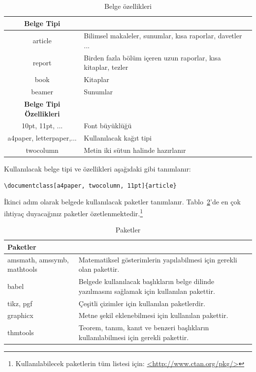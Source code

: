 \documentclass{article}
\begin{document}
\begin{table}[h]
\begin{center}
\caption{Belge özellikleri\label{tab: preamble}}
\begin{tabular}{| c | p{7cm} |}
\hline
\textbf{Belge Tipi} & \\ \hline
article & Bilimsel makaleler, sunumlar, kısa raporlar, davetler ... \\ \hline
report & Birden fazla bölüm içeren uzun raporlar, kısa kitaplar, tezler \\ \hline
book & Kitaplar \\ \hline
beamer & Sunumlar \\ \hline \hline
\textbf{Belge Tipi Özellikleri} & \\
\hline
10pt, 11pt, ... & Font büyüklüğü \\ \hline
a4paper, letterpaper,... & Kullanılacak kağıt tipi \\ \hline
twocolumn & Metin iki sütun halinde hazırlanır \\ \hline
\end{tabular}
\end{center}
\end{table}

Kullanılacak belge tipi ve özellikleri aşağıdaki gibi tanımlanır:

\begin{verbatim}
\documentclass[a4paper, twocolumn, 11pt]{article}
\end{verbatim}

İkinci adım olarak belgede kullanılacak paketler tanımlanır. Tablo~\ref{tab: packages}'de en çok ihtiyaç duyacağınız paketler özetlenmektedir.\footnote{Kullanılabilecek paketlerin tüm listesi için: \url{<http://www.ctan.org/pkg/>}}

\begin{table}[h]
\begin{center}
\caption{Paketler\label{tab: packages}}
\begin{tabular}{| p{4cm} | p{7cm} |}
\hline
\textbf{Paketler} & \\ \hline
amsmath, amssymb, mathtools & Matematiksel gösterimlerin yapılabilmesi için gerekli olan pakettir. \\ \hline
babel & Belgede kullanılacak başlıkların belge dilinde yazılmasını sağlamak için kullanılan pakettir. \\ \hline
tikz, pgf & Çeşitli çizimler için kullanılan paketlerdir. \\ \hline
graphicx & Metne şekil eklenebilmesi için kullanılan pakettir. \\ \hline
thmtools & Teorem, tanım, kanıt ve benzeri başlıkların kullanılabilmesi için gerekli pakettir. \\ \hline
\end{tabular}
\end{center}
\end{table}
\end{document}
